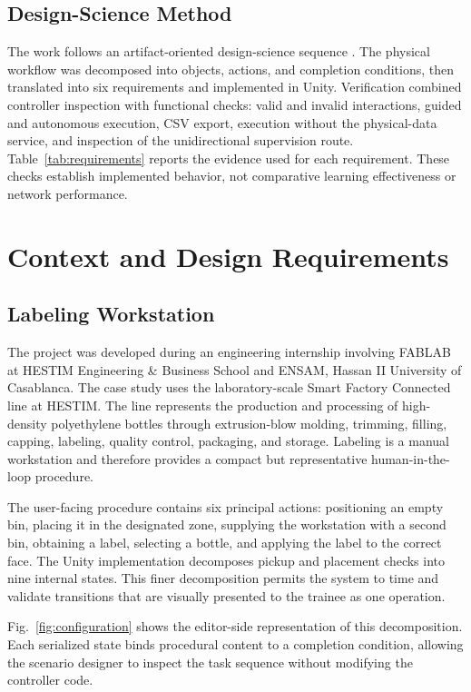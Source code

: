 \documentclass[conference]{IEEEtran}
\begin{document}
\subsection{Design-Science Method}

The work follows an artifact-oriented design-science sequence \cite{Hevner2004}. The physical workflow was decomposed into objects, actions, and completion conditions, then translated into six requirements and implemented in Unity. Verification combined controller inspection with functional checks: valid and invalid interactions, guided and autonomous execution, CSV export, execution without the physical-data service, and inspection of the unidirectional supervision route. Table~\ref{tab:requirements} reports the evidence used for each requirement. These checks establish implemented behavior, not comparative learning effectiveness or network performance.

\section{Context and Design Requirements}

\subsection{Labeling Workstation}

The project was developed during an engineering internship involving FABLAB at HESTIM Engineering \& Business School and ENSAM, Hassan II University of Casablanca. The case study uses the laboratory-scale Smart Factory Connected line at HESTIM. The line represents the production and processing of high-density polyethylene bottles through extrusion-blow molding, trimming, filling, capping, labeling, quality control, packaging, and storage. Labeling is a manual workstation and therefore provides a compact but representative human-in-the-loop procedure.

The user-facing procedure contains six principal actions: positioning an empty bin, placing it in the designated zone, supplying the workstation with a second bin, obtaining a label, selecting a bottle, and applying the label to the correct face. The Unity implementation decomposes pickup and placement checks into nine internal states. This finer decomposition permits the system to time and validate transitions that are visually presented to the trainee as one operation.

Fig.~\ref{fig:configuration} shows the editor-side representation of this decomposition. Each serialized state binds procedural content to a completion condition, allowing the scenario designer to inspect the task sequence without modifying the controller code.
\end{document}
